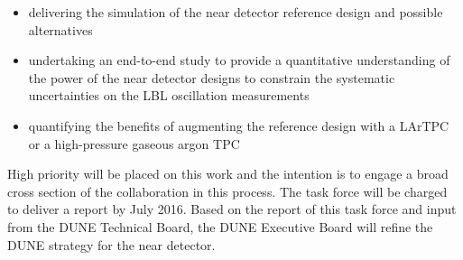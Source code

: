 \begin{itemize}
\item delivering the simulation of the near detector reference design and possible alternatives

\item undertaking an end-to-end study to provide a quantitative understanding of 
the power of the near detector designs to constrain the systematic uncertainties on the LBL 
oscillation measurements

\item quantifying the benefits of augmenting the reference design with a LArTPC 
or a high-pressure gaseous argon TPC
\end{itemize}

High priority will be placed on this work and the intention is to engage a broad 
cross section of the collaboration in this process. The task force will be charged 
to deliver a report by July 2016. Based on the report of this task force and input 
from the DUNE Technical Board, the DUNE Executive Board will refine the DUNE strategy 
for the near detector.


